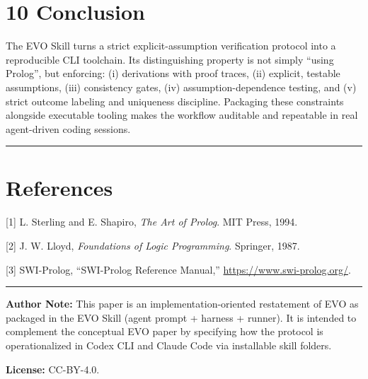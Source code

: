 \documentclass[12pt,a4paper]{article}
\begin{document}
\section{10 Conclusion}

The EVO Skill turns a strict explicit-assumption verification protocol into a reproducible CLI toolchain. Its distinguishing property is not simply ``using Prolog'', but enforcing: (i) derivations with proof traces, (ii) explicit, testable assumptions, (iii) consistency gates, (iv) assumption-dependence testing, and (v) strict outcome labeling and uniqueness discipline. Packaging these constraints alongside executable tooling makes the workflow auditable and repeatable in real agent-driven coding sessions.

\medskip\noindent\rule{\linewidth}{0.4pt}\medskip

\section{References}

[1] L. Sterling and E. Shapiro, \textit{The Art of Prolog}. MIT Press, 1994.

[2] J. W. Lloyd, \textit{Foundations of Logic Programming}. Springer, 1987.

[3] SWI-Prolog, ``SWI-Prolog Reference Manual,'' \url{https://www.swi-prolog.org/}.

\medskip\noindent\rule{\linewidth}{0.4pt}\medskip

\textbf{Author Note:} This paper is an implementation-oriented restatement of EVO as packaged in the EVO Skill (agent prompt + harness + runner). It is intended to complement the conceptual EVO paper by specifying how the protocol is operationalized in Codex CLI and Claude Code via installable skill folders.

\textbf{License:} CC-BY-4.0.
\end{document}

